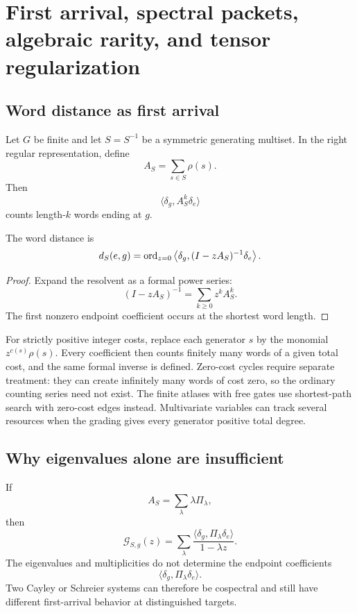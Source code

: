 \section{First arrival, spectral packets, algebraic rarity, and tensor regularization}\label{g:ch:spectral-algebraic}


\subsection{Word distance as first arrival}
Let $G$ be finite and let $S=S^{-1}$ be a symmetric generating multiset.  In the right regular representation, define
\[
A_S=\sum_{s\in S}\rho(s).
\]
Then
\[
\langle\delta_g,A_S^k\delta_e\rangle
\]
counts length-$k$ words ending at $g$.

\begin{theorem}
The word distance is
\[
d_S(e,g)
=
\operatorname{ord}_{z=0}
\left\langle
\delta_g,(I-zA_S)^{-1}\delta_e
\right\rangle.
\]
\end{theorem}
\begin{proof}
Expand the resolvent as a formal power series:
\[
(I-zA_S)^{-1}=\sum_{k\ge0}z^kA_S^k.
\]
The first nonzero endpoint coefficient occurs at the shortest word length.
\end{proof}

For strictly positive integer costs, replace each generator $s$ by the monomial $z^{c(s)}\rho(s)$.  Every coefficient then counts finitely many words of a given total cost, and the same formal inverse is defined.  Zero-cost cycles require separate treatment: they can create infinitely many words of cost zero, so the ordinary counting series need not exist.  The finite atlases with free gates use shortest-path search with zero-cost edges instead.  Multivariate variables can track several resources when the grading gives every generator positive total degree.

\subsection{Why eigenvalues alone are insufficient}
If
\[
A_S=\sum_\lambda\lambda\Pi_\lambda,
\]
then
\[
\mathcal G_{S,g}(z)
=
\sum_\lambda
\frac{\langle\delta_g,\Pi_\lambda\delta_e\rangle}{1-\lambda z}.
\]
The eigenvalues and multiplicities do not determine the endpoint coefficients
\[
\langle\delta_g,\Pi_\lambda\delta_e\rangle.
\]
Two Cayley or Schreier systems can therefore be cospectral and still have different first-arrival behavior at distinguished targets.

